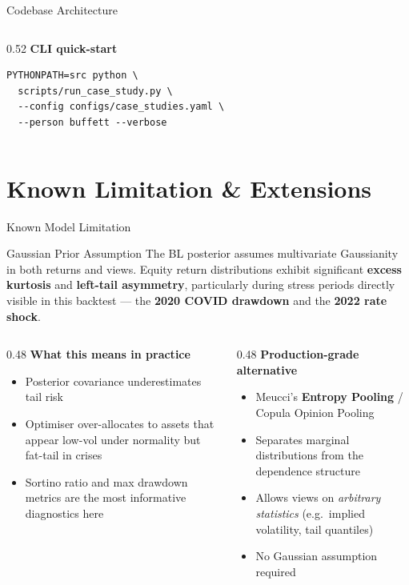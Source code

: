 \documentclass[aspectratio=169, 10pt]{beamer}
\begin{document}
\begin{frame}[fragile]{Codebase Architecture}
\begin{columns}[T]
\begin{column}{0.52\textwidth}
      \bigskip
      \textbf{CLI quick-start}
      \begin{verbatim}
PYTHONPATH=src python \
  scripts/run_case_study.py \
  --config configs/case_studies.yaml \
  --person buffett --verbose
      \end{verbatim}
    \end{column}
  \end{columns}
\end{frame}

\section{Known Limitation \& Extensions}

\begin{frame}{Known Model Limitation}

  \begin{alertblock}{Gaussian Prior Assumption}
    The BL posterior assumes multivariate Gaussianity in both returns and views.
    Equity return distributions exhibit significant \textbf{excess kurtosis} and
    \textbf{left-tail asymmetry}, particularly during stress periods directly
    visible in this backtest — the \textbf{2020 COVID drawdown} and the
    \textbf{2022 rate shock}.
  \end{alertblock}

  \bigskip
  \begin{columns}[T]
    \begin{column}{0.48\textwidth}
      \textbf{What this means in practice}
      \begin{itemize}
        \item Posterior covariance underestimates tail risk
        \item Optimiser over-allocates to assets that appear
              low-vol under normality but fat-tail in crises
        \item Sortino ratio and max drawdown metrics
              are the most informative diagnostics here
      \end{itemize}
    \end{column}

    \begin{column}{0.48\textwidth}
      \textbf{Production-grade alternative}
      \begin{itemize}
        \item Meucci's \textbf{Entropy Pooling} / Copula Opinion Pooling
        \item Separates marginal distributions from the
              dependence structure
        \item Allows views on \emph{arbitrary statistics}
              (e.g.\ implied volatility, tail quantiles)
        \item No Gaussian assumption required
      \end{itemize}
    \end{column}
  \end{columns}
\end{frame}
\end{document}
